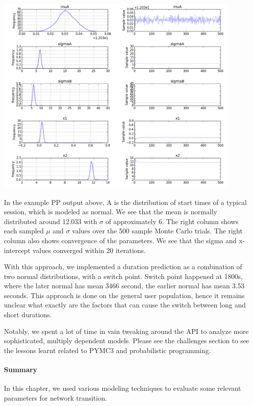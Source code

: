 \documentclass[]{article}
\newenvironment{Figure}
  {\par\medskip\noindent\minipage{\linewidth}}
  {\endminipage\par\medskip}
\begin{document}
\begin{Figure}
 \centering
 \includegraphics[height = 10cm, width =12cm]{ppsample.png}
\end{Figure}

In the example PP output above, A is the distribution of start times of a typical session, which is modeled as normal. We see that the mean is normally distributed around 12.033 with $\sigma$ of approximately 6. The right column shows each sampled $\mu$ and $\sigma$ values over the 500 sample Monte Carlo trials. The right column also shows convergence of the parameters. We see that the sigma and x-intercept values converged within 20 iterations.

With this approach, we implemented a duration prediction as a combination of two normal distributions, with a switch point. Switch point happened at 1800s, where the later normal has mean 3466 second, the earlier normal has mean 3.53 seconds. This approach is done on the general user population, hence it remains unclear what exactly are the factors that can cause the switch between long and short durations. 

Notably, we spent a lot of time in vain tweaking around the API to analyze more sophisticated, multiply dependent models. Please see the challenges section to see the lessons learnt related to PYMC3 and probabilistic programming.

\paragraph{Summary}
In this chapter, we used various modeling techniques to evaluate some relevant parameters for network transition.
\end{document}
